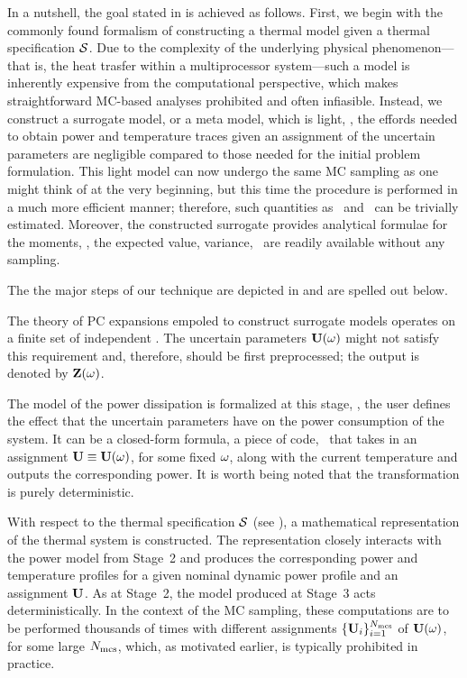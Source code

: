 
In a nutshell, the goal stated in  is achieved as follows. First, we begin with the commonly found formalism of constructing a thermal model given a thermal specification $\mathcal{S}$. Due to the complexity of the underlying physical phenomenon---that is, the heat trasfer within a multiprocessor system---such a model is inherently expensive from the computational perspective, which makes straightforward MC-based analyses prohibited and often infiasible. Instead, we construct a surrogate model, or a meta model, which is light, \ie, the effords needed to obtain power and temperature traces given an assignment of the uncertain parameters are negligible compared to those needed for the initial problem formulation. This light model can now undergo the same MC sampling as one might think of at the very beginning, but this time the procedure is performed in a much more efficient manner; therefore, such quantities as \cdfs\ and \pdfs\ can be trivially estimated. Moreover, the constructed surrogate provides analytical formulae for the moments, \ie, the expected value, variance, \etc\ are readily available without any sampling.

The the major steps of our technique are depicted in  and are spelled out below.

 The theory of PC expansions empoled to construct surrogate models operates on a finite set of independent \rvs. The uncertain parameters $\mathbf{U}(\omega)$ might not satisfy this requirement and, therefore, should be first preprocessed; the output is denoted by $\mathbf{Z}(\omega)$.

 The model of the power dissipation is formalized at this stage, \ie, the user defines the effect that the uncertain parameters have on the power consumption of the system. It can be a closed-form formula, a piece of code, \etc\ that takes in an assignment $\mathbf{U} \equiv \mathbf{U}(\omega)$, for some fixed $\omega$, along with the current temperature and outputs the corresponding power. It is worth being noted that the transformation is purely deterministic.

 With respect to the thermal specification $\mathcal{S}$ (see ), a mathematical representation of the thermal system is constructed. The representation closely interacts with the power model from Stage~2 and produces the corresponding power and temperature profiles for a given nominal dynamic power profile and an assignment $\mathbf{U}$. As at Stage~2, the model produced at Stage~3 acts deterministically. In the context of the MC sampling, these computations are to be performed thousands of times with different assignments $\{ \mathbf{U}_i \}_{i = 1}^{N_\text{mcs}}$ of $\mathbf{U}(\omega)$, for some large $N_\text{mcs}$, which, as motivated earlier, is typically prohibited in practice.

